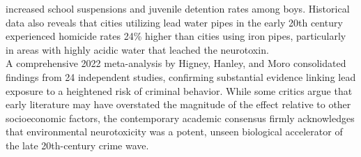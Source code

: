 \documentclass[
]{article}
\begin{document}
increased school suspensions and juvenile detention rates among boys.
Historical data also reveals that cities utilizing lead water pipes in
the early 20th century experienced homicide rates 24\% higher than
cities using iron pipes, particularly in areas with highly acidic water
that leached the neurotoxin.\\
A comprehensive 2022 meta-analysis by Higney, Hanley, and Moro
consolidated findings from 24 independent studies, confirming
substantial evidence linking lead exposure to a heightened risk of
criminal behavior. While some critics argue that early literature may
have overstated the magnitude of the effect relative to other
socioeconomic factors, the contemporary academic consensus firmly
acknowledges that environmental neurotoxicity was a potent, unseen
biological accelerator of the late 20th-century crime wave.
\end{document}
